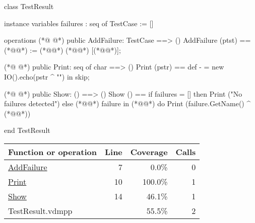 \begin{vdmpp}[breaklines=true]
class TestResult

instance variables
  failures : seq of TestCase := []
  
operations
(*@
\label{AddFailure:7}
@*)
  public AddFailure: TestCase ==> ()
  AddFailure (ptst) == (*@@*) := (*@@*) (*@\vdmnotcovered{\^{}}@*) [(*@@*)];

(*@
\label{Print:10}
@*)
  public Print: seq of char ==> ()
  Print (pstr) ==
    def - = new IO().echo(pstr ^ "\n") in skip;
    
(*@
\label{Show:14}
@*)
  public Show: () ==> ()
  Show () ==
    if failures = [] then
      Print ("No failures detected")
    else
      (*@@*) failure in (*@@*) do
        Print (failure.GetName() ^ (*@@*))
  
end TestResult
\end{vdmpp}
\bigskip
\begin{longtable}{|l|r|r|r|}
\hline
Function or operation & Line & Coverage & Calls \\
\hline
\hline
\hyperref[AddFailure:7]{AddFailure} & 7&0.0\% & 0 \\
\hline
\hyperref[Print:10]{Print} & 10&100.0\% & 1 \\
\hline
\hyperref[Show:14]{Show} & 14&46.1\% & 1 \\
\hline
\hline
TestResult.vdmpp & & 55.5\% & 2 \\
\hline
\end{longtable}

